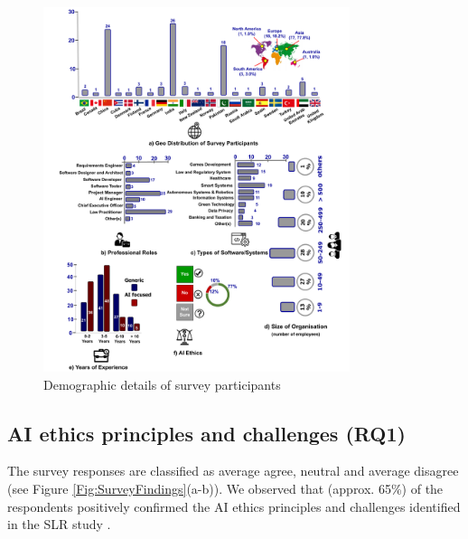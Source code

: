 \begin{figure}
\centerline{\includegraphics[width=0.8\textwidth]{Figures/Demographics.pdf}}
\caption{Demographic details of survey participants}
	\label{Fig:Demographics}
\end{figure}

\subsection{AI ethics principles and challenges (RQ1)} \label{sec:AI ethics principles and challenges (RQ1)}

The survey responses are classified as average agree, neutral and average disagree (see Figure \ref{Fig:SurveyFindings}(a-b)). We observed that (approx. 65\%) of the respondents positively confirmed the AI ethics principles and challenges identified in the SLR study \cite{AR13}. 

